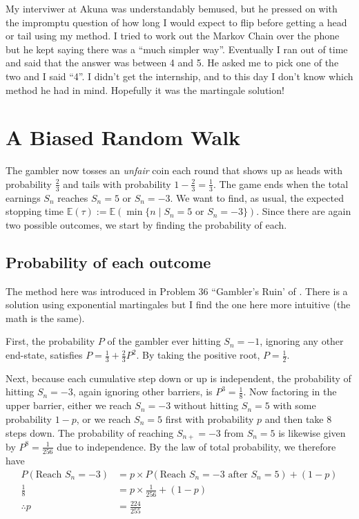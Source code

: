 \documentclass[11pt]{article}
\newcommand{\E}{\mathbb{E}}
\begin{document}
My interviwer at Akuna was understandably bemused, but he pressed on with the impromptu question of how long I would expect to flip before getting a head or tail using my method. I tried to work out the Markov Chain over the phone but he kept saying there was a ``much simpler way''. Eventually I ran out of time and said that the answer was between 4 and 5. He asked me to pick one of the two and I said ``4''. I didn't get the internship, and to this day I don't know which method he had in mind. Hopefully it was the martingale solution!

\section{A Biased Random Walk}
The gambler now tosses an \emph{unfair} coin each round that shows up as heads with probability $\frac{2}{3}$ and tails with probability $1 - \frac{2}{3} = \frac{1}{3}$. The game ends when the total earnings $S_n$ reaches $S_n = 5$ or $S_n = -3$. We want to find, as usual, the expected stopping time $\E(\tau) := \E(\min\{n\mid S_n = 5 \text{ or } S_n = -3\})$. Since there are again two possible outcomes, we start by finding the probability of each.

\subsection{Probability of each outcome}
The method here was introduced in Problem 36 ``Gambler's Ruin' of \cite{mosteller1987fifty}. There is a solution using exponential martingales but I find the one here more intuitive (the math is the same).

First, the probability $P$ of the gambler ever hitting $S_n = -1$, ignoring any other end-state, satisfies $P = \frac{1}{3} + \frac{2}{3}P^2$.
By taking the positive root, $P = \frac{1}{2}$.

Next, because each cumulative step down or up is independent, the probability of hitting $S_n = -3$, again ignoring other barriers, is $P^3 = \frac{1}{8}$. Now factoring in the upper barrier, either we reach $S_n = -3$ without hitting $S_n = 5$ with some probability $1-p$, or we reach $S_n = 5$ first with probability $p$ and then take 8 steps down. The probability of reaching $S_{n+} = -3$ from $S_n = 5$ is likewise given by $P^8 = \frac{1}{256}$ due to independence. By the law of total probability, we therefore have
\begin{align*}
P(\text{Reach $S_n = -3$}) &= p \times P(\text{Reach $S_n = -3$ after $S_n = 5$}) + (1-p) \\
\frac{1}{8} &= p\times\frac{1}{256} + (1-p) \\
\therefore p &= \frac{224}{255}
\end{align*}
\end{document}
